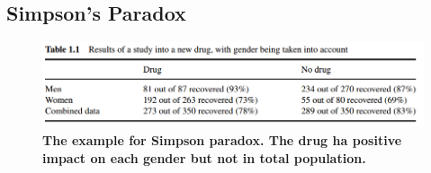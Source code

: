 \documentclass[11pt]{article}
\begin{document}
\subsection{Simpson's Paradox}
\begin{figure}
\begin{minipage}[t]{1\linewidth}
  \centering
  \centerline{\includegraphics[scale = 0.5]{simpson_paradox.png}}
\end{minipage}
\caption{\footnotesize{\textbf{The example for Simpson paradox. The drug ha positive impact on each gender but not in total population. \citep{glymour2016causal}}}}
\label{fig: simpson_paradox}
\end{figure}
\end{document}
